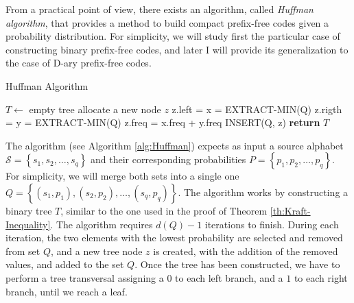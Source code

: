 From a practical point of view, there exists an algorithm, called \emph{Huffman algorithm}, that provides a method to build compact prefix-free codes given a probability distribution. For simplicity, we will study first the particular case of constructing binary prefix-free codes, and later I will provide its generalization to the case of D-ary prefix-free codes.

\begin{algorithm}
\caption{Huffman Algorithm}
\label{alg:Huffman}
\begin{algorithmic}
    \State $T \gets$ empty tree
        \State allocate a new node $z$
        \State z.left = x = EXTRACT-MIN(Q)
        \State z.rigth = y = EXTRACT-MIN(Q)
        \State z.freq = x.freq + y.freq
        \State INSERT(Q, z)
    \EndFor
    \State \textbf{return} $T$
\EndProcedure
\end{algorithmic}
\end{algorithm}

The algorithm (see Algorithm \ref{alg:Huffman}) expects as input a source alphabet $\mathcal{S}=\left\{ s_{1},s_{2},\ldots,s_{q}\right\}$ and their corresponding probabilities $P = \left\{ p_{1}, p_{2}, \ldots, p_{q} \right\}$. For simplicity, we will merge both sets into a single one $Q = \left\{ (s_{1}, p_{1}), (s_{2}, p_{2}), \ldots, (s_{q}, p_{q}) \right\}$. The algorithm works by constructing a binary tree $T$, similar to the one used in the proof of Theorem \ref{th:Kraft-Inequality}. The algorithm requires $d(Q) - 1$ iterations to finish. During each iteration, the two elements with the lowest probability are selected and removed from set $Q$, and a new tree node $z$ is created, with the addition of the removed values, and added to the set $Q$. Once the tree has been constructed, we have to perform a tree transversal assigning a $0$ to each left branch, and a $1$ to each right branch, until we reach a leaf.

